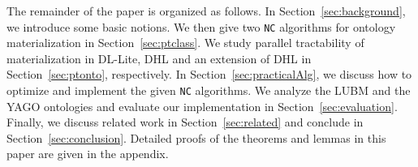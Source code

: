 The remainder of the paper is organized as follows. In Section~\ref{sec:background}, we introduce some basic notions.
We then give two \texttt{NC} algorithms for ontology materialization in Section~\ref{sec:ptclass}.
We study parallel tractability of materialization in DL-Lite, DHL and an extension of DHL in Section~\ref{sec:ptonto}, respectively.
In Section~\ref{sec:practicalAlg},
we discuss how to optimize and implement the given \texttt{NC} algorithms.
We analyze the LUBM and the YAGO ontologies and evaluate our implementation in Section~\ref{sec:evaluation}.
Finally, we discuss related work in Section~\ref{sec:related} and conclude in Section~\ref{sec:conclusion}. Detailed proofs of the theorems and lemmas in this paper are given in the appendix.



